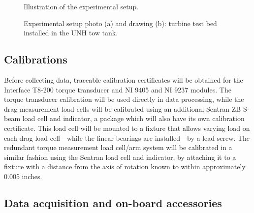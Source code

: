 \begin{figure}[ht]
    \centering
    \caption{Illustration of the experimental setup.}
    \label{fig:exp-setup}
\end{figure}


\begin{figure}[ht]
    \centering
    
    
    \caption{Experimental setup photo (a) and drawing (b): turbine test bed
        installed in the UNH tow tank.}
    
    \label{fig:exp-setup}
\end{figure}


\subsection{Calibrations}

Before collecting data, traceable calibration certificates will be obtained for
the Interface T8-200 torque transducer and NI 9405 and NI 9237 modules. The
torque transducer calibration will be used directly in data processing, while
the drag measurement load cells will be calibrated using an additional Sentran
ZB S-beam load cell and indicator, a package which will also have its own
calibration certificate. This load cell will be mounted to a fixture that allows
varying load on each drag load cell---while the linear bearings are
installed---by a lead screw.  The redundant torque measurement load cell/arm
system will be calibrated in a similar fashion using the Sentran load cell and
indicator, by attaching it to a fixture with a distance from the axis of
rotation known to within approximately 0.005 inches.





\subsection{Data acquisition and on-board accessories}

